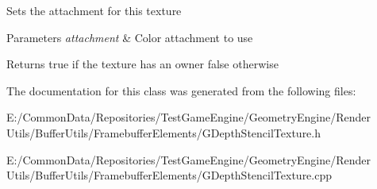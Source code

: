Sets the attachment for this texture 
\begin{DoxyParams}{Parameters}
{\em attachment} & Color attachment to use \\
\hline
\end{DoxyParams}
\begin{DoxyReturn}{Returns}
true if the texture has an owner false otherwise 
\end{DoxyReturn}


The documentation for this class was generated from the following files\+:\begin{DoxyCompactItemize}
\item 
E\+:/\+Common\+Data/\+Repositories/\+Test\+Game\+Engine/\+Geometry\+Engine/\+Render Utils/\+Buffer\+Utils/\+Framebuffer\+Elements/G\+Depth\+Stencil\+Texture.\+h\item 
E\+:/\+Common\+Data/\+Repositories/\+Test\+Game\+Engine/\+Geometry\+Engine/\+Render Utils/\+Buffer\+Utils/\+Framebuffer\+Elements/G\+Depth\+Stencil\+Texture.\+cpp\end{DoxyCompactItemize}
